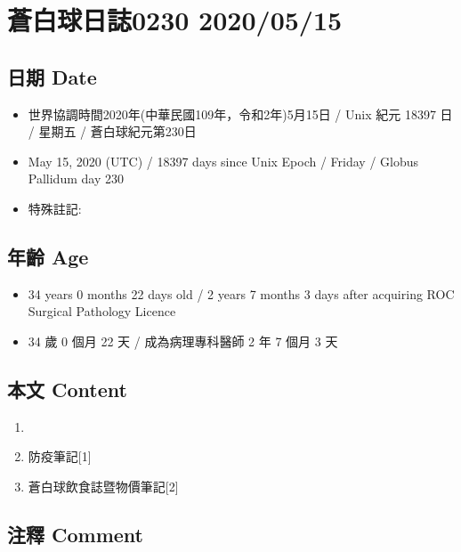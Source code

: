 \documentclass[
]{article}
\providecommand{\tightlist}{%
  \setlength{\itemsep}{0pt}\setlength{\parskip}{0pt}}
\begin{document}
\hypertarget{ux84bcux767dux7403ux65e5ux8a8c0230-20200515}{%
\section{蒼白球日誌0230
2020/05/15}\label{ux84bcux767dux7403ux65e5ux8a8c0230-20200515}}

\hypertarget{ux65e5ux671f-date-14}{%
\subsection{日期 Date}\label{ux65e5ux671f-date-14}}

\begin{itemize}
\tightlist
\item
  世界協調時間2020年(中華民國109年，令和2年)5月15日 / Unix 紀元 18397 日
  / 星期五 / 蒼白球紀元第230日
\item
  May 15, 2020 (UTC) / 18397 days since Unix Epoch / Friday / Globus
  Pallidum day 230
\item
  特殊註記:
\end{itemize}

\hypertarget{ux5e74ux9f61-age-14}{%
\subsection{年齡 Age}\label{ux5e74ux9f61-age-14}}

\begin{itemize}
\tightlist
\item
  34 years 0 months 22 days old / 2 years 7 months 3 days after
  acquiring ROC Surgical Pathology Licence
\item
  34 歲 0 個月 22 天 / 成為病理專科醫師 2 年 7 個月 3 天
\end{itemize}

\hypertarget{ux672cux6587-content-14}{%
\subsection{本文 Content}\label{ux672cux6587-content-14}}

\begin{enumerate}
\def\labelenumi{\arabic{enumi}.}
\item
\item
  防疫筆記{[}1{]}
\item
  蒼白球飲食誌暨物價筆記{[}2{]}
\end{enumerate}

\hypertarget{ux6ce8ux91cb-comment-14}{%
\subsection{注釋 Comment}\label{ux6ce8ux91cb-comment-14}}
\end{document}
